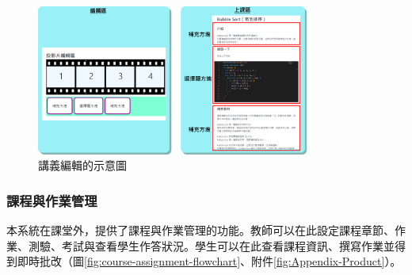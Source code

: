 \begin{enumerate}

  \begin{figure}[H]
    \centering
    \includegraphics[width=0.8\textwidth]{images/timezone.png}
    \caption{講義編輯的示意圖}
    \label{fig:edit}
  \end{figure}

\end{enumerate}

\subsubsection{課程與作業管理}
\label{sec:course-assignment}

本系統在課堂外，提供了課程與作業管理的功能。教師可以在此設定課程章節、作業、測驗、考試與查看學生作答狀況。學生可以在此查看課程資訊、撰寫作業並得到即時批改（圖\ref{fig:course-assignment-flowchart}、附件\ref{fig:Appendix-Product}）。

